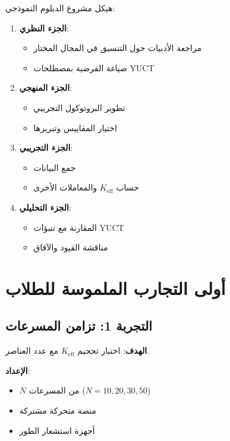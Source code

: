 \documentclass[12pt,a4paper]{article}
\begin{document}
	هيكل مشروع الدبلوم النموذجي:
	\begin{enumerate}
		\item \textbf{الجزء النظري}:
		\begin{itemize}
			\item مراجعة الأدبيات حول التنسيق في المجال المختار
			\item صياغة الفرضية بمصطلحات YUCT
		\end{itemize}
		
		\item \textbf{الجزء المنهجي}:
		\begin{itemize}
			\item تطوير البروتوكول التجريبي
			\item اختيار المقاييس وتبريرها
		\end{itemize}
		
		\item \textbf{الجزء التجريبي}:
		\begin{itemize}
			\item جمع البيانات
			\item حساب $K_{\mathrm{eff}}$ والمعاملات الأخرى
		\end{itemize}
		
		\item \textbf{الجزء التحليلي}:
		\begin{itemize}
			\item المقارنة مع تنبؤات YUCT
			\item مناقشة القيود والآفاق
		\end{itemize}
	\end{enumerate}
	
	\section{أولى التجارب الملموسة للطلاب}
	
	\subsection{التجربة 1: تزامن المسرعات}
	
	\textbf{الهدف}: اختبار تحجيم \(K_{\mathrm{eff}}\) مع عدد العناصر.
	
	\textbf{الإعداد}:
	\begin{itemize}
		\item $N$ من المسرعات ($N = 10, 20, 30, 50$)
		\item منصة متحركة مشتركة
		\item أجهزة استشعار الطور
	\end{itemize}
	
\end{document}
